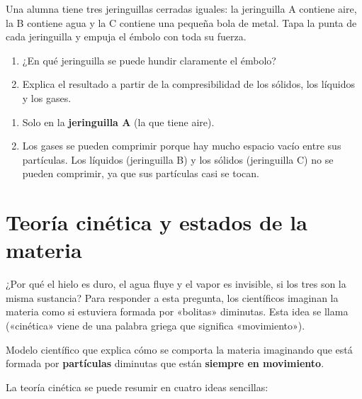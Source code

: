 \begin{exercise}
    Una alumna tiene tres jeringuillas cerradas iguales: la jeringuilla A contiene aire, la B contiene agua y la C contiene una pequeña bola de metal. Tapa la punta de cada jeringuilla y empuja el émbolo con toda su fuerza.
    \begin{enumerate}[label=\letraminuscula]
        \item ¿En qué jeringuilla se puede hundir claramente el émbolo?
        \item Explica el resultado a partir de la compresibilidad de los sólidos, los líquidos y los gases.
    \end{enumerate}
    \begin{solu}
        \begin{enumerate}[label=\alph*)]
            \item Solo en la \textbf{jeringuilla A} (la que tiene aire).
            \item Los gases se pueden comprimir porque hay mucho espacio vacío entre sus partículas. Los líquidos (jeringuilla B) y los sólidos (jeringuilla C) no se pueden comprimir, ya que sus partículas casi se tocan.
        \end{enumerate}
    \end{solu}
\end{exercise}


\section{Teoría cinética y estados de la materia}

¿Por qué el hielo es duro, el agua fluye y el vapor es invisible, si los tres son la misma sustancia? Para responder a esta pregunta, los científicos imaginan la materia como si estuviera formada por «bolitas» diminutas. Esta idea se llama  («cinética» viene de una palabra griega que significa «movimiento»).

\begin{definition}
    Modelo científico que explica cómo se comporta la materia imaginando que está formada por \textbf{partículas} diminutas que están \textbf{siempre en movimiento}.
\end{definition}

La teoría cinética se puede resumir en cuatro ideas sencillas:

